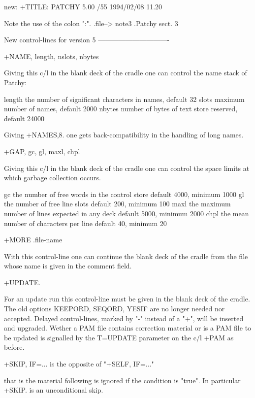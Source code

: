    new:
          +TITLE:  PATCHY   5.00 /55  1994/02/08 11.20

Note the use of the colon ":".
.file-->  note3
.Patchy sect. 3


                 New control-lines for version 5
                 -------------------------------


\item
+NAME, length, nslots, nbytes

Giving this c/l in the blank deck of the cradle one can control the name
stack of Patchy:

      length  the number of significant characters in names, default 32
      slots   maximum number of names, default 2000
      nbytes  number of bytes of text store reserved, default 24000

Giving  +NAMES,8. one gets back-compatibility in the handling of long names.


\item
+GAP, gc, gl, maxl, chpl

Giving this c/l in the blank deck of the cradle one can control the space
limits at which garbage collection occurs.

      gc      the number of free words in the control store
                  default 4000, minimum 1000
      gl      the number of free line slots
                  default 200, minimum 100
      maxl    the maximum number of lines expected in any deck
                  default 5000, minimum 2000
      chpl    the mean number of characters per line
                  default 40, minimum 20


\item
+MORE   .file-name

With this control-line one can continue the blank deck of the cradle
from the file whose name is given in the comment field.


\item
+UPDATE.

For an update run this control-line must be given in the blank deck of
the cradle. The old options KEEPORD, SEQORD, YESIF are no longer needed
nor accepted. Delayed control-lines, marked by "-" instead of a "+",
will be inserted and upgraded. Wether a PAM file contains correction
material or is a PAM file to be updated is signalled by the T=UPDATE
parameter on the c/l +PAM as before.


\item
+SKIP, IF=...   is the opposite of "+SELF, IF=..."

that is the material following is ignored if the condition is "true".
In particular  +SKIP.  is an unconditional skip.


